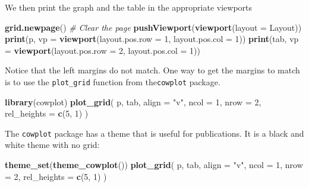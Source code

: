 \documentclass[
]{book}
\newenvironment{Shaded}{\begin{snugshade}}{\end{snugshade}}
\newcommand{\AttributeTok}[1]{\textcolor[rgb]{0.13,0.29,0.53}{#1}}
\newcommand{\CommentTok}[1]{\textcolor[rgb]{0.56,0.35,0.01}{\textit{#1}}}
\newcommand{\DecValTok}[1]{\textcolor[rgb]{0.00,0.00,0.81}{#1}}
\newcommand{\FunctionTok}[1]{\textcolor[rgb]{0.13,0.29,0.53}{\textbf{#1}}}
\newcommand{\NormalTok}[1]{#1}
\newcommand{\StringTok}[1]{\textcolor[rgb]{0.31,0.60,0.02}{#1}}
\begin{document}
We then print the graph and the table in the appropriate viewports

\begin{Shaded}
\begin{Highlighting}[]
\FunctionTok{grid.newpage}\NormalTok{() }\CommentTok{\# Clear the page}
\FunctionTok{pushViewport}\NormalTok{(}\FunctionTok{viewport}\NormalTok{(}\AttributeTok{layout =}\NormalTok{ Layout))}
\FunctionTok{print}\NormalTok{(p, }\AttributeTok{vp =} \FunctionTok{viewport}\NormalTok{(}\AttributeTok{layout.pos.row =} \DecValTok{1}\NormalTok{, }\AttributeTok{layout.pos.col =} \DecValTok{1}\NormalTok{))}
\FunctionTok{print}\NormalTok{(tab, }\AttributeTok{vp =} \FunctionTok{viewport}\NormalTok{(}\AttributeTok{layout.pos.row =} \DecValTok{2}\NormalTok{, }\AttributeTok{layout.pos.col =} \DecValTok{1}\NormalTok{))}
\end{Highlighting}
\end{Shaded}

Notice that the left margins do not match. One way to get the margins to match is to use the \texttt{plot\_grid}
function from the\texttt{cowplot} package.

\begin{Shaded}
\begin{Highlighting}[]
\FunctionTok{library}\NormalTok{(cowplot)}
\FunctionTok{plot\_grid}\NormalTok{(}
\NormalTok{  p, }
\NormalTok{  tab, }
  \AttributeTok{align =} \StringTok{"v"}\NormalTok{, }
  \AttributeTok{ncol =} \DecValTok{1}\NormalTok{, }
  \AttributeTok{nrow =} \DecValTok{2}\NormalTok{, }
  \AttributeTok{rel\_heights =} \FunctionTok{c}\NormalTok{(}\DecValTok{5}\NormalTok{, }\DecValTok{1}\NormalTok{)}
\NormalTok{)}
\end{Highlighting}
\end{Shaded}

The \texttt{cowplot} package has a theme that is useful for publications. It is a black and white theme with no grid:

\begin{Shaded}
\begin{Highlighting}[]
\FunctionTok{theme\_set}\NormalTok{(}\FunctionTok{theme\_cowplot}\NormalTok{())}
\FunctionTok{plot\_grid}\NormalTok{(}
\NormalTok{  p, }
\NormalTok{  tab, }
  \AttributeTok{align =} \StringTok{"v"}\NormalTok{, }
  \AttributeTok{ncol =} \DecValTok{1}\NormalTok{, }
  \AttributeTok{nrow =} \DecValTok{2}\NormalTok{, }
  \AttributeTok{rel\_heights =} \FunctionTok{c}\NormalTok{(}\DecValTok{5}\NormalTok{, }\DecValTok{1}\NormalTok{)}
\NormalTok{)}
\end{Highlighting}
\end{Shaded}
\end{document}
